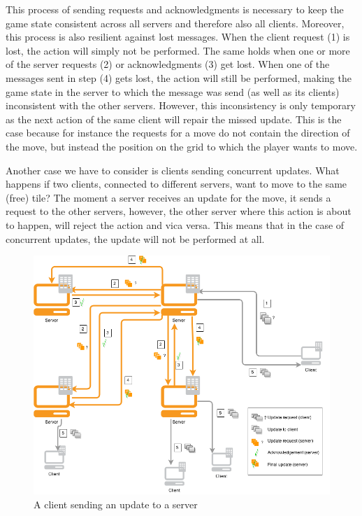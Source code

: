 This process of sending requests and acknowledgments is necessary to keep the game state consistent across all servers and therefore also all clients. 
Moreover, this process is also resilient against lost messages. 
When the client request (1) is lost, the action will simply not be performed. 
The same holds when one or more of the server requests (2) or acknowledgments (3) get lost. 
When one of the messages sent in step (4) gets lost, the action will still be performed, making the game state in the server to which the message was send (as well as its clients) inconsistent with the other servers. 
However, this inconsistency is only temporary as the next action of the same client will repair the missed update. 
This is the case because for instance the requests for a move do not contain the direction of the move, but instead the position on the grid to which the player wants to move.

Another case we have to consider is clients sending concurrent updates. 
What happens if two clients, connected to different servers, want to move to the same (free) tile? 
The moment a server receives an update for the move, it sends a request to the other servers, however, the other server where this action is about to happen, will reject the action and vica versa. 
This means that in the case of concurrent updates, the update will not be performed at all.

\begin{figure}[h!]
  \centering
    \includegraphics[width=\textwidth]{diagrams/game-update}
    
  \caption{A client sending an update to a server}
  \label{fig:update_diagram}
\end{figure}

